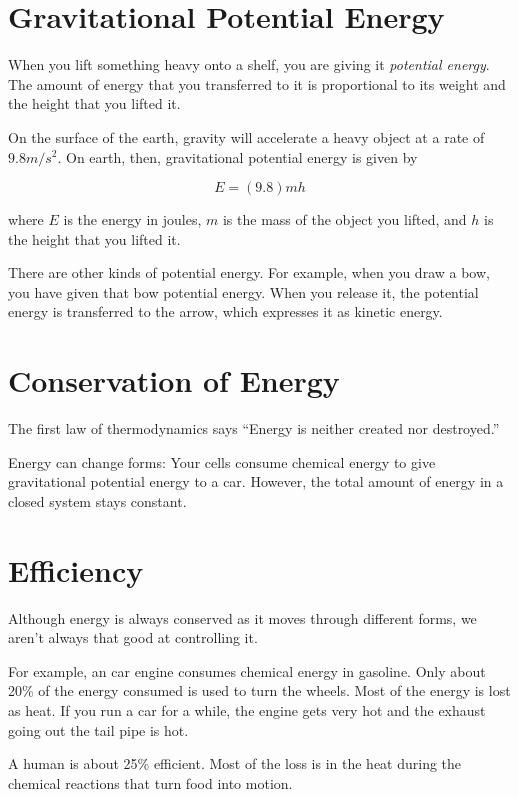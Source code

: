 \section{Gravitational Potential Energy}

When you lift something heavy onto a shelf, you are giving it
\textit{potential energy}. The amount of energy that you transferred
to it is proportional to its weight and the height that you lifted it.

On the surface of the earth, gravity will accelerate a heavy object at
a rate of $9.8 m/s^2$. On earth, then, gravitational potential energy is given by

$$E = (9.8)mh$$

where $E$ is the energy in joules, $m$ is the mass of the object you
lifted, and $h$ is the height that you lifted it.

There are other kinds of potential energy. For example, when you draw
a bow, you have given that bow potential energy. When you release it,
the potential energy is transferred to the arrow, which expresses it
as kinetic energy.

\section{Conservation of Energy}

The first law of thermodynamics says ``Energy is neither created nor
destroyed.''

Energy can change forms: Your cells consume chemical energy to give
gravitational potential energy to a car.  However, the total amount of
energy in a closed system stays constant.

\section{Efficiency}

Although energy is always conserved as it moves through different
forms, we aren't always that good at controlling it.

For example, an car engine consumes chemical energy in gasoline. Only
about 20\% of the energy consumed is used to turn the wheels.  Most of
the energy is lost as heat. If you run a car for a while, the engine
gets very hot and the exhaust going out the tail pipe is hot.

A human is about 25\% efficient. Most of the loss is in the heat
during the chemical reactions that turn food into motion.

